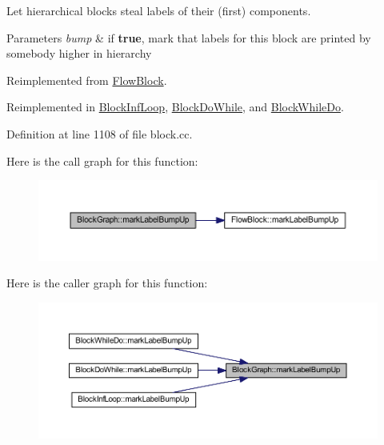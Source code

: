 Let hierarchical blocks steal labels of their (first) components. 


\begin{DoxyParams}{Parameters}
{\em bump} & if {\bfseries{true}}, mark that labels for this block are printed by somebody higher in hierarchy \\
\hline
\end{DoxyParams}


Reimplemented from \mbox{\hyperlink{class_flow_block_a0882ce85a017e4988eda779de6a86089}{Flow\+Block}}.



Reimplemented in \mbox{\hyperlink{class_block_inf_loop_a4b07279f936c69240ceacf4d5e8dfebc}{Block\+Inf\+Loop}}, \mbox{\hyperlink{class_block_do_while_ab391ccd9276eec9200396ea6e8db7a96}{Block\+Do\+While}}, and \mbox{\hyperlink{class_block_while_do_ac850d56fa3365a195b91373ef00d7bd3}{Block\+While\+Do}}.



Definition at line 1108 of file block.\+cc.

Here is the call graph for this function\+:
\nopagebreak
\begin{figure}[H]
\begin{center}
\leavevmode
\includegraphics[width=350pt]{class_block_graph_a67e2a75a80e60655a9936045d40983f6_cgraph}
\end{center}
\end{figure}
Here is the caller graph for this function\+:
\nopagebreak
\begin{figure}[H]
\begin{center}
\leavevmode
\includegraphics[width=350pt]{class_block_graph_a67e2a75a80e60655a9936045d40983f6_icgraph}
\end{center}
\end{figure}
\mbox{\label{class_block_graph_a6047a66449b05bf62b33a2bef8642033}} 
